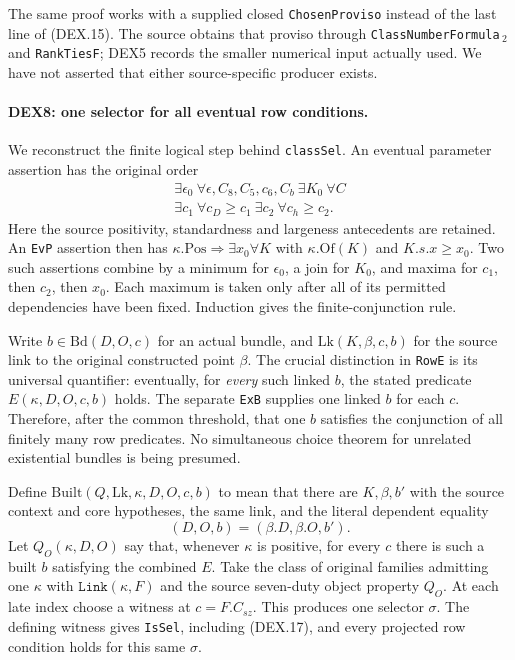 The same proof works with a supplied closed \texttt{ChosenProviso}
instead of the last line of (DEX.15). The source obtains that proviso
through \texttt{ClassNumberFormula}$\,{}_2$ and
\texttt{RankTiesF}; DEX5 records the smaller numerical input actually
used. We have not asserted that either source-specific producer exists.

\paragraph{DEX8: one selector for all eventual row conditions.}
\label{claim:DEX8}
We reconstruct the finite logical step behind \texttt{classSel}.
An eventual parameter assertion has the original order
\[
 \begin{gathered}
 \exists\epsilon_0\ \forall\epsilon,C_8,C_5,c_6,C_b\
 \exists K_0\ \forall C\\
 \exists c_1\ \forall c_D\ge c_1\
 \exists c_2\ \forall c_h\ge c_2 .
 \end{gathered}                                           \tag{DEX.16}
\]
Here the source positivity, standardness and largeness antecedents
are retained. An \texttt{EvP} assertion then has
$\kappa.\mathrm{Pos}\Rightarrow\exists x_0\forall K$ with
$\kappa.\mathrm{Of}(K)$ and $K.s.x\ge x_0$.
Two such assertions combine by a minimum for $\epsilon_0$, a join
for $K_0$, and maxima for $c_1$, then $c_2$, then $x_0$.
Each maximum is taken only after all of its permitted dependencies
have been fixed. Induction gives the finite-conjunction rule.

Write $b\in\mathrm{Bd}(D,O,c)$ for an actual bundle, and
$\mathrm{Lk}(K,\beta,c,b)$ for the source link to the original
constructed point $\beta$. The crucial distinction in
\texttt{RowE} is its universal quantifier: eventually, for
\emph{every} such linked $b$, the stated predicate $E(\kappa,D,O,c,b)$
holds. The separate \texttt{ExB} supplies one linked $b$ for each
$c$. Therefore, after the common threshold, that one $b$ satisfies
the conjunction of all finitely many row predicates. No simultaneous
choice theorem for unrelated existential bundles is being presumed.

Define $\mathrm{Built}(Q,\mathrm{Lk},\kappa,D,O,c,b)$ to mean that
there are $K,\beta,b'$ with the source context and core hypotheses,
the same link, and the literal dependent equality
\[
                 (D,O,b)=(\beta.D,\beta.O,b').            \tag{DEX.17}
\]
Let $Q_O(\kappa,D,O)$ say that, whenever $\kappa$ is positive,
for every $c$ there is such a built $b$ satisfying the combined $E$.
Take the class of original families admitting one $\kappa$ with
$\texttt{Link}(\kappa,F)$ and the source seven-duty object property
$Q_O$. At each late index choose a witness at $c=F.C_{sz}$.
This produces one selector $\sigma$. The defining witness gives
\texttt{IsSel}, including (DEX.17), and every projected row condition
holds for this same $\sigma$.

